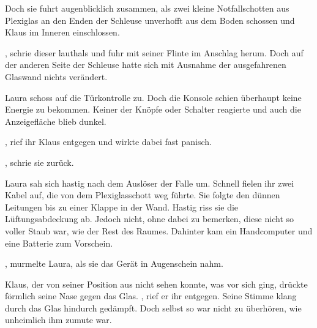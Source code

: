 \par

Doch sie fuhrt augenblicklich zusammen, als zwei kleine Notfallschotten aus Plexiglas an den Enden der Schleuse unverhofft aus dem Boden schossen und Klaus im Inneren einschlossen.

\par

, schrie dieser lauthals und fuhr mit seiner Flinte im Anschlag herum. Doch auf der anderen Seite der Schleuse hatte sich mit Ausnahme der ausgefahrenen Glaswand nichts verändert.

\par

Laura schoss auf die Türkontrolle zu. Doch die Konsole schien überhaupt keine Energie zu bekommen. Keiner der Knöpfe oder Schalter reagierte und auch die Anzeigefläche blieb dunkel.

\par

, rief ihr Klaus entgegen und wirkte dabei fast panisch.

\par

, schrie sie zurück. 

\par

Laura sah sich hastig nach dem Auslöser der Falle um. Schnell fielen ihr zwei Kabel auf, die von dem Plexiglasschott weg führte. Sie folgte den dünnen Leitungen bis zu einer Klappe in der Wand. Hastig riss sie die Lüftungsabdeckung ab. Jedoch nicht, ohne dabei zu bemerken, diese nicht so voller Staub war, wie der Rest des Raumes. Dahinter kam ein Handcomputer und eine Batterie zum Vorschein.

\par

, murmelte Laura, als sie das Gerät in Augenschein nahm. 

\par

Klaus, der von seiner Position aus nicht sehen konnte, was vor sich ging, drückte förmlich seine Nase gegen das Glas. , rief er ihr entgegen. Seine Stimme klang durch das Glas hindurch gedämpft. Doch selbst so war nicht zu überhören, wie unheimlich ihm zumute war. 

